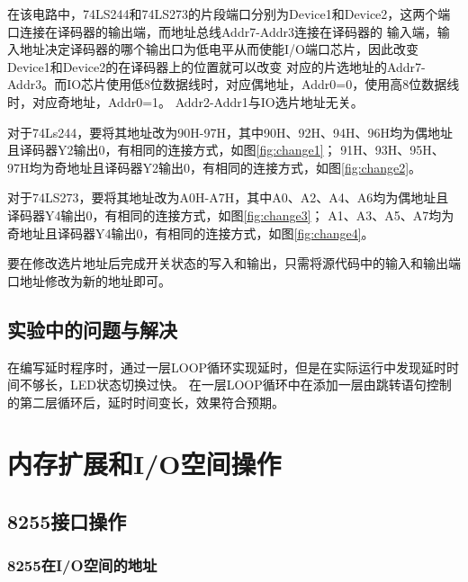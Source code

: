 \documentclass[12pt, a4paper, oneside]{ctexart}
\begin{document}
    在该电路中，74LS244和74LS273的片段端口分别为Device1和Device2，这两个端口连接在译码器的输出端，而地址总线Addr7-Addr3连接在译码器的
    输入端，输入地址决定译码器的哪个输出口为低电平从而使能I/O端口芯片，因此改变Device1和Device2的在译码器上的位置就可以改变
    对应的片选地址的Addr7-Addr3。而IO芯片使用低8位数据线时，对应偶地址，Addr0=0，使用高8位数据线时，对应奇地址，Addr0=1。
    Addr2-Addr1与IO选片地址无关。

    对于74Ls244，要将其地址改为90H-97H，其中90H、92H、94H、96H均为偶地址且译码器Y2输出0，有相同的连接方式，如图\ref{fig:change1}；
    91H、93H、95H、97H均为奇地址且译码器Y2输出0，有相同的连接方式，如图\ref{fig:change2}。

    对于74LS273，要将其地址改为A0H-A7H，其中A0、A2、A4、A6均为偶地址且译码器Y4输出0，有相同的连接方式，如图\ref{fig:change3}；
    A1、A3、A5、A7均为奇地址且译码器Y4输出0，有相同的连接方式，如图\ref{fig:change4}。
    
    要在修改选片地址后完成开关状态的写入和输出，只需将源代码中的输入和输出端口地址修改为新的地址即可。

    \subsection{实验中的问题与解决}
    在编写延时程序时，通过一层LOOP循环实现延时，但是在实际运行中发现延时时间不够长，LED状态切换过快。
    在一层LOOP循环中在添加一层由跳转语句控制的第二层循环后，延时时间变长，效果符合预期。
    \section{内存扩展和I/O空间操作}
    \subsection{8255接口操作}
    \subsubsection{8255在I/O空间的地址}
\end{document}
